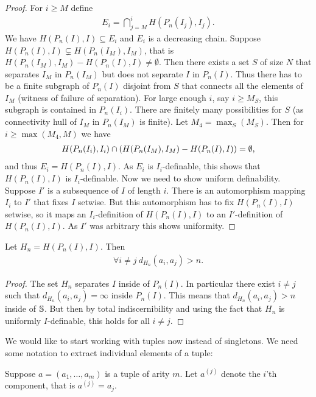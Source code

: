 \begin{proof}
  For $i \geq M$ define
  \begin{align*}
    E_i = \bigcap_{j = M}^{i} H(P_n(I_j), I_j).
  \end{align*}
  We have $H(P_n(I), I) \subseteq E_i$ and $E_i$ is a decreasing chain.
  Suppose $H(P_n(I), I) \subsetneq H(P_n(I_M), I_M)$, that is ${H(P_n(I_M), I_M) - H(P_n(I), I)} \neq \emptyset$.
  Then there exists a set $S$ of size $N$ that separates $I_M$ in $P_n(I_M)$ but does not separate $I$ in $P_n(I)$.
  Thus there has to be a finite subgraph of $P_n(I)$ disjoint from $S$ that connects all the elements of $I_M$ (witness of failure of separation).
  For large enough $i$, say $i \geq M_S$, this subgraph is contained in $P_n(I_i)$.
  There are finitely many possibilities for $S$ (as connectivity hull of $I_M$ in $P_n(I_M)$ is finite).
  Let $M_4 = \max_S(M_S)$.
  Then for $i \geq \max(M_4, M)$ we have
  \begin{align*}
    H(P_n(I_i), I_i) \cap \left(H(P_n(I_M), I_M) - H(P_n(I), I)\right) = \emptyset,    
  \end{align*}
  and thus $E_i = H(P_n(I), I)$.
  As $E_i$ is $I_i$-definable, this shows that $H(P_n(I), I)$ is $I_i$-definable.
  Now we need to show uniform definability.
  Suppose $I'$ is a subsequence of $I$ of length $i$.
  There is an automorphism mapping $I_i$ to $I'$ that fixes $I$ setwise.
  But this automorphism has to fix $H(P_n(I), I)$ setwise,
  so it maps an $I_i$-definition of $H(P_n(I), I)$ to an $I'$-definition of $H(P_n(I), I)$.
  As $I'$ was arbitrary this shows uniformity.
\end{proof}

\begin{Corollary} \label{inf_dis}
  Let $H_n = H(P_n(I), I)$.
  Then 
  \begin{align*}
    \forall i \neq j \ d_{H_n}(a_i, a_j) > n.
  \end{align*}
\end{Corollary}

\begin{proof}
  The set $H_n$ separates $I$ inside of $P_n(I)$.
  In particular there exist $i \neq j$ such that $d_{H_n}(a_i, a_j) = \infty$ inside $P_n(I)$.
  This means that $d_{H_n}(a_i, a_j) > n$ inside of $\mathbb S$.
  But then by total indiscernibility and using the fact that $H_n$ is uniformly $I$-definable, this holds for all $i \neq j$.
\end{proof}

\newcommand{\tpl}[2]{{#1}^{(#2)}}

We would like to start working with tuples now instead of singletons.
We need some notation to extract individual elements of a tuple:
\begin{Definition}
  Suppose $a = (a_1, \ldots, a_m)$ is a tuple of arity $m$.
  Let $\tpl{a}{j}$ denote the $i$'th component, that is $\tpl{a}{j} = a_j$.
\end{Definition}

